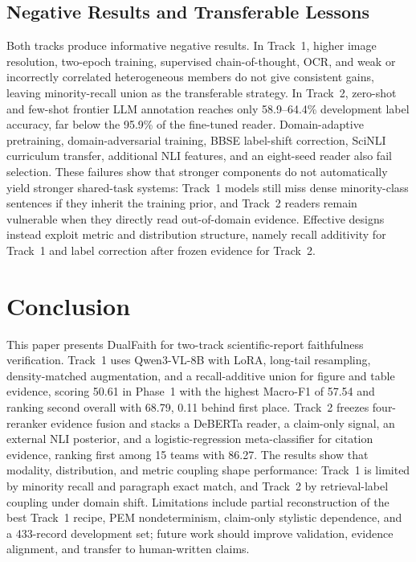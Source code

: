 \documentclass[runningheads]{llncs}
\newcommand{\method}{DualFaith}
\newcommand{\mf}{Macro-F1}
\newcommand{\pem}{PEM}
\begin{document}
\subsection{Negative Results and Transferable Lessons}
Both tracks produce informative negative results. In Track~1, higher image resolution, two-epoch training, supervised chain-of-thought, OCR, and weak or incorrectly correlated heterogeneous members do not give consistent gains, leaving minority-recall union as the transferable strategy. In Track~2, zero-shot and few-shot frontier LLM annotation reaches only 58.9--64.4\% development label accuracy, far below the 95.9\% of the fine-tuned reader. Domain-adaptive pretraining, domain-adversarial training, BBSE label-shift correction, SciNLI curriculum transfer, additional NLI features, and an eight-seed reader also fail selection. These failures show that stronger components do not automatically yield stronger shared-task systems: Track~1 models still miss dense minority-class sentences if they inherit the training prior, and Track~2 readers remain vulnerable when they directly read out-of-domain evidence. Effective designs instead exploit metric and distribution structure, namely recall additivity for Track~1 and label correction after frozen evidence for Track~2.

\section{Conclusion}

This paper presents \method{} for two-track scientific-report faithfulness verification. Track~1 uses Qwen3-VL-8B with LoRA, long-tail resampling, density-matched augmentation, and a recall-additive union for figure and table evidence, scoring 50.61 in Phase~1 with the highest \mf{} of 57.54 and ranking second overall with 68.79, 0.11 behind first place. Track~2 freezes four-reranker evidence fusion and stacks a DeBERTa reader, a claim-only signal, an external NLI posterior, and a logistic-regression meta-classifier for citation evidence, ranking first among 15 teams with 86.27. The results show that modality, distribution, and metric coupling shape performance: Track~1 is limited by minority recall and paragraph exact match, and Track~2 by retrieval-label coupling under domain shift. Limitations include partial reconstruction of the best Track~1 recipe, \pem{} nondeterminism, claim-only stylistic dependence, and a 433-record development set; future work should improve validation, evidence alignment, and transfer to human-written claims.
\end{document}
